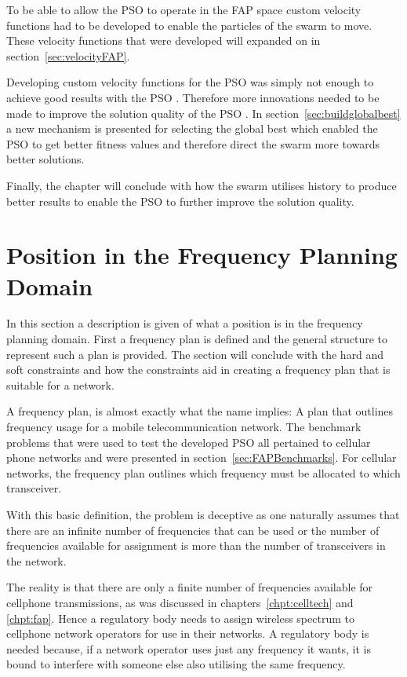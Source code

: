 To be able to allow the \gls{PSO} to operate in the \gls{FAP} space custom velocity functions had to be developed to enable the particles of the swarm to move. These velocity functions that were developed will expanded on in section~\ref{sec:velocityFAP}. 

Developing custom velocity functions for the \gls{PSO} was simply not enough to achieve good results with the \gls{PSO} . Therefore more innovations needed to be made to improve the solution quality of the \gls{PSO} . In section~\ref{sec:buildglobalbest} a new mechanism is presented for selecting the global best which enabled the \gls{PSO} to get better fitness values and therefore direct the swarm more towards better solutions. 

Finally, the chapter will conclude with how the swarm utilises history to produce better results to enable the \gls{PSO} to further improve the solution quality.
\section{Position in the Frequency Planning Domain}
In this section a description is given of what a position is in the frequency planning domain. First a frequency plan is defined and the general structure to represent such a plan is provided. The section will conclude with the hard and soft constraints and how the constraints aid in creating a frequency plan that is suitable for a network.

A frequency plan, is almost exactly what the name implies: A plan that outlines frequency usage for a mobile telecommunication network. The benchmark problems that were used to test the developed \gls{PSO} all pertained to cellular phone networks and were presented in section~\ref{sec:FAPBenchmarks}. For cellular networks, the frequency plan outlines which frequency must be allocated to which transceiver.

With this basic definition, the problem is deceptive as one naturally assumes that there are an infinite number of frequencies that can be used or the number of frequencies available for assignment is more than the number of transceivers in the network. 

The reality is that there are only a finite number of frequencies available for cellphone transmissions, as was discussed in chapters~\ref{chpt:celltech} and \ref{chpt:fap}. Hence a regulatory body needs to assign wireless spectrum to cellphone network operators for use in their networks. A regulatory body is needed because, if a network operator uses just any frequency it wants, it is bound to interfere with someone else also utilising the same frequency.

